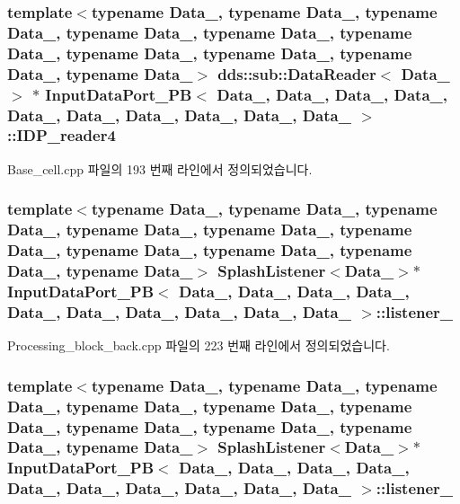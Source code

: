 \subsubsection[{\texorpdfstring{I\+D\+P\+\_\+reader4}{IDP_reader4}}]{\setlength{\rightskip}{0pt plus 5cm}template$<$typename Data\+\_, typename Data\+\_, typename Data\+\_, typename Data\+\_, typename Data\+\_, typename Data\+\_, typename Data\+\_, typename Data\+\_, typename Data\+\_, typename Data\+\_$>$ dds\+::sub\+::\+Data\+Reader$<$ Data\+\_ $>$ $\ast$ {\bf Input\+Data\+Port\+\_\+\+PB}$<$ Data\+\_, Data\+\_, Data\+\_, Data\+\_, Data\+\_, Data\+\_, Data\+\_, Data\+\_, Data\+\_, Data\+\_ $>$\+::I\+D\+P\+\_\+reader4}\hypertarget{classInputDataPort__PB_aeb99473c8a874344cd133be87607bad2}{}\label{classInputDataPort__PB_aeb99473c8a874344cd133be87607bad2}


Base\+\_\+cell.\+cpp 파일의 193 번째 라인에서 정의되었습니다.

\subsubsection[{\texorpdfstring{listener\+\_\+0}{listener_0}}]{\setlength{\rightskip}{0pt plus 5cm}template$<$typename Data\+\_, typename Data\+\_, typename Data\+\_, typename Data\+\_, typename Data\+\_, typename Data\+\_, typename Data\+\_, typename Data\+\_, typename Data\+\_, typename Data\+\_$>$ {\bf Splash\+Listener}$<$Data\+\_$>$$\ast$ {\bf Input\+Data\+Port\+\_\+\+PB}$<$ Data\+\_, Data\+\_, Data\+\_, Data\+\_, Data\+\_, Data\+\_, Data\+\_, Data\+\_, Data\+\_, Data\+\_ $>$\+::listener\+\_}\hypertarget{classInputDataPort__PB_a77b666d75615c4284e2e894e2a93d0ce}{}\label{classInputDataPort__PB_a77b666d75615c4284e2e894e2a93d0ce}


Processing\+\_\+block\+\_\+back.\+cpp 파일의 223 번째 라인에서 정의되었습니다.

\subsubsection[{\texorpdfstring{listener\+\_\+1}{listener_1}}]{\setlength{\rightskip}{0pt plus 5cm}template$<$typename Data\+\_, typename Data\+\_, typename Data\+\_, typename Data\+\_, typename Data\+\_, typename Data\+\_, typename Data\+\_, typename Data\+\_, typename Data\+\_, typename Data\+\_$>$ {\bf Splash\+Listener}$<$Data\+\_$>$$\ast$ {\bf Input\+Data\+Port\+\_\+\+PB}$<$ Data\+\_, Data\+\_, Data\+\_, Data\+\_, Data\+\_, Data\+\_, Data\+\_, Data\+\_, Data\+\_, Data\+\_ $>$\+::listener\+\_}\hypertarget{classInputDataPort__PB_acb665e197ba9b211af65cd591467ba66}{}\label{classInputDataPort__PB_acb665e197ba9b211af65cd591467ba66}


